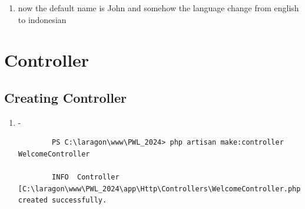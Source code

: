 \documentclass[12pt,titlepage]{article}
\begin{document}
\begin{enumerate}[label=\alph*.]
\begin{verbatim}
        use Illuminate\Support\Facades\Route;
        
        /*
        |--------------------------------------------------------------------------
        | Web Routes
        |--------------------------------------------------------------------------
        |
        | Here is where you can register web routes for your application. These
        | routes are loaded by the RouteServiceProvider and all of them will
        | be assigned to the "web" middleware group. Make something great!
        |
        */
        
        Route::get('/', function () {
            // return view('welcome');
            return 'Welcome';
        });
        
        Route::get('/hello', function () {
            return 'Hello World';
        });
        
        Route::get('/world', function () {
            return 'World';
        }); 
        
        Route::get('/about', function () {
            return '2241720145 - Muhammad Baihaqi Aulia Asyari';
        }); 
        
        Route::get('/user/{name?}', function ($name='John') {
            return 'Nama saya ' . $name;
        }); 
        
        Route::get('/posts/{post}/comments/{comment}', function ($postId, $commentId) {
            return 'Pos ke-' . $postId . ' komentar ke-: ' . $commentId;
        });
        
        Route::get('/articles/{id}', function ($id) {
            return 'Article Page with ID ' . $id;
        });        
    \end{verbatim}
    \item now the default name is John and somehow the language change from english to indonesian
\end{enumerate}

\section{Controller}
\subsection{Creating Controller}

\begin{enumerate}[label=\alph*.]
    \item -
    \begin{verbatim}
        PS C:\laragon\www\PWL_2024> php artisan make:controller WelcomeController

        INFO  Controller [C:\laragon\www\PWL_2024\app\Http\Controllers\WelcomeController.php] created successfully.
    \end{verbatim}
\end{enumerate}
\end{document}
